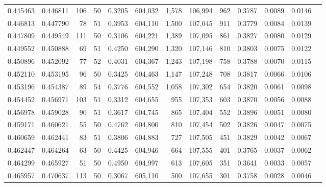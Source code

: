 \begin{tabular}{rrrrrrrrrrrrr}
0.445463 & 0.446811 &   106 &  50 &                                     0.3205 & 604,032 &   1,578 & 106,994 &     962 & 0.3787 & 0.0089 & 0.0146 \\
0.446813 & 0.447790 &    78 &  51 &                                     0.3953 & 604,110 &   1,500 & 107,045 &     911 & 0.3779 & 0.0084 & 0.0139 \\
0.447809 & 0.449549 &   111 &  50 &                                     0.3106 & 604,221 &   1,389 & 107,095 &     861 & 0.3827 & 0.0080 & 0.0129 \\
0.449552 & 0.450888 &    69 &  51 &                                     0.4250 & 604,290 &   1,320 & 107,146 &     810 & 0.3803 & 0.0075 & 0.0122 \\
0.450896 & 0.452092 &    77 &  52 &                                     0.4031 & 604,367 &   1,243 & 107,198 &     758 & 0.3788 & 0.0070 & 0.0115 \\
0.452110 & 0.453195 &    96 &  50 &                                     0.3425 & 604,463 &   1,147 & 107,248 &     708 & 0.3817 & 0.0066 & 0.0106 \\
0.453196 & 0.454387 &    89 &  54 &                                     0.3776 & 604,552 &   1,058 & 107,302 &     654 & 0.3820 & 0.0061 & 0.0098 \\
0.454452 & 0.456971 &   103 &  51 &                                     0.3312 & 604,655 &     955 & 107,353 &     603 & 0.3870 & 0.0056 & 0.0088 \\
0.456978 & 0.459028 &    90 &  51 &                                     0.3617 & 604,745 &     865 & 107,404 &     552 & 0.3896 & 0.0051 & 0.0080 \\
0.459171 & 0.460621 &    55 &  50 &                                     0.4762 & 604,800 &     810 & 107,454 &     502 & 0.3826 & 0.0047 & 0.0075 \\
0.460659 & 0.462441 &    83 &  51 &                                     0.3806 & 604,883 &     727 & 107,505 &     451 & 0.3829 & 0.0042 & 0.0067 \\
0.462447 & 0.464264 &    63 &  50 &                                     0.4425 & 604,946 &     664 & 107,555 &     401 & 0.3765 & 0.0037 & 0.0062 \\
0.464299 & 0.465927 &    51 &  50 &                                     0.4950 & 604,997 &     613 & 107,605 &     351 & 0.3641 & 0.0033 & 0.0057 \\
0.465957 & 0.470637 &   113 &  50 &                                     0.3067 & 605,110 &     500 & 107,655 &     301 & 0.3758 & 0.0028 & 0.0046 \\

\end{tabular}
